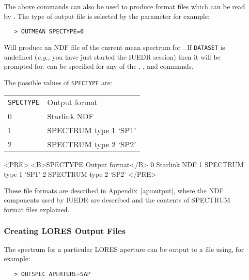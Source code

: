 The above commands can also be used to produce
 format files
which can be read by \@.  The type of output file is
selected by the  parameter for example:

\begin{verbatim}
   > OUTMEAN SPECTYPE=0
\end{verbatim}

Will produce an NDF file of the current mean spectrum for
\@.
If \verb+DATASET+ is undefined ({\it{e.g.,}} you have just started the IUEDR
session) then it will be prompted for.  
can be specified for any of the ,
, 
and  commands.

The possible values of \verb+SPECTYPE+ are:

\begin{latexonly}
\begin{tabular}{ll}
{\tt SPECTYPE} & Output format\\
0              & Starlink NDF\\
1              & SPECTRUM type 1 `SP1'\\
2              & SPECTRUM type 2 `SP2'\\
\end{tabular}
\end{latexonly}

\begin{htmlonly}
\begin{rawhtml}
<PRE>
<B>SPECTYPE    Output format</B>
   0        Starlink NDF
   1        SPECTRUM type 1 `SP1'
   2        SPECTRUM type 2 `SP2'
</PRE>
\end{rawhtml}
\end{htmlonly}

These file formats are described in Appendix~\ref{ap:output},
where the NDF components used by IUEDR are described and the
contents of SPECTRUM format files explained.

\subsubsection{Creating LORES Output Files}

The spectrum for a particular LORES aperture can be output to a file using, for
example:

\begin{verbatim}
   > OUTSPEC APERTURE=SAP
\end{verbatim}


